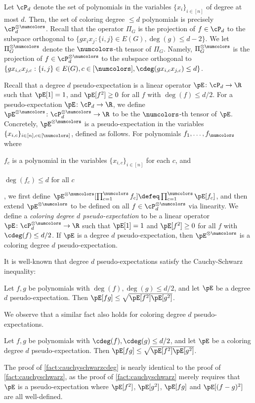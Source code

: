 Let $\cP_d$ denote the set of polynomials in the variables $\{x_i\}_{i \in [n]}$ of degree at most $d$. Then, the set of coloring degree $\leq d$ polynomials is precisely $\cP_d^{\otimes \numcolors}$. Recall that the operator $\Pi_G$ is the projection of $f \in \cP_d$ to the subspace orthogonal to $\{g x_i x_j : \{i,j\} \in E(G), \deg(g) \leq d-2\}$. We let $\Pi_G^{\otimes \numcolors}$ denote the $\numcolors$-th tensor of $\Pi_G$. Namely, $\Pi_G^{\otimes \numcolors}$ is the projection of $f \in \cP_d^{\otimes \numcolors}$ to the subspace orthogonal to $\{g x_{i,c} x_{j,c} : \{i,j\} \in E(G), c \in [\numcolors], \cdeg(g x_{i,c} x_{j,c}) \leq d\}$. 

Recall that a degree $d$ pseudo-expectation is a linear operator $\pE \colon \cP_d \to \R$ such that $\pE[1] = 1$, and $\pE[f^2] \geq 0$ for all $f$ with $\deg(f) \leq d/2$. For a pseudo-expectation $\pE \colon \cP_d \to \R$, we define $\pE^{\otimes \numcolors} \colon \cP_d^{\otimes \numcolors} \to \R$ to be the $\numcolors$-th tensor of $\pE$. Concretely, $\pE^{\otimes \numcolors}$ is a pseudo-expectation in the variables $\{x_{i,c}\}_{i \in [n], c \in [\numcolors]}$, defined as follows. For polynomials $f_1, \dots, f_{\numcolors}$ where \begin{inparaenum}[(1)] \item $f_c$ is a polynomial in the variables $\{x_{i,c}\}_{i \in [n]}$ for each $c$, and \item $\deg(f_c) \leq d$ for all $c$\end{inparaenum}, we first define $\pE^{\otimes \numcolors}[\prod_{c = 1}^{\numcolors} f_c] \defeq \prod_{c = 1}^{\numcolors} \pE[f_c]$, and then extend $\pE^{\otimes \numcolors}$ to be defined on all $f \in \cP_d^{\otimes \numcolors}$ via linearity. We define a \emph{coloring degree $d$ pseudo-expectation} to be a linear operator $\pE \colon \cP_d^{\otimes \numcolors} \to \R$ such that $\pE[1] = 1$ and $\pE[f^2] \geq 0$ for all $f$ with $\cdeg(f) \leq d/2$. If $\pE$ is a degree $d$ pseudo-expectation, then $\pE^{\otimes \numcolors}$ is a coloring degree $d$ pseudo-expectation.

It is well-known that degree $d$ pseudo-expectations satisfy the Cauchy-Schwarz inequality:
\begin{fact}
\label{fact:cauchyschwarz}
Let $f,g$ be polynomials with $\deg(f), \deg(g) \leq d/2$, and let $\pE$ be a degree $d$ pseudo-expectation. Then $\pE[f g] \leq \sqrt{\pE[f^2] \pE[g^2]}$.
\end{fact}
We observe that a similar fact also holds for coloring degree $d$ pseudo-expectations.
\begin{fact}
\label{fact:cauchyschwarzcdeg}
Let $f,g$ be polynomials with $\cdeg(f), \cdeg(g) \leq d/2$, and let $\pE$ be a coloring degree $d$ pseudo-expectation. Then $\pE[f g] \leq \sqrt{\pE[f^2] \pE[g^2]}$.
\end{fact}
The proof of \cref{fact:cauchyschwarzcdeg} is nearly identical to the proof of \cref{fact:cauchyschwarz}, as the proof of \cref{fact:cauchyschwarz} merely requires that $\pE$ is a pseudo-expectation where $\pE[f^2]$, $\pE[g^2]$, $\pE[fg]$ and $\pE[(f-g)^2]$ are all well-defined.



